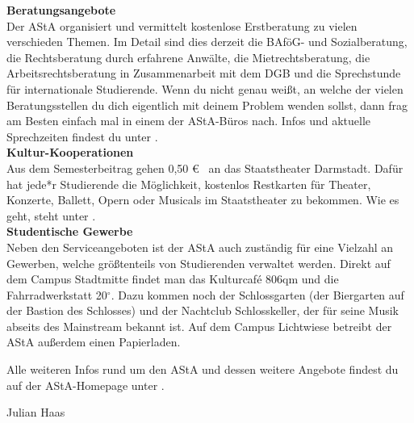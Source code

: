 {    \noindent\textbf{Beratungsangebote}\\
    Der AStA organisiert und vermittelt kostenlose Erstberatung zu vielen verschieden Themen. Im Detail sind dies derzeit die BAföG- und Sozialberatung, die Rechtsberatung durch erfahrene Anwälte, die Mietrechtsberatung, die Arbeitsrechtsberatung in Zusammenarbeit mit dem DGB und die Sprechstunde für internationale Studierende. Wenn du nicht genau weißt, an welche der vielen Beratungsstellen du dich eigentlich mit deinem Problem wenden sollst, dann frag am Besten einfach mal in einem der AStA-Büros nach. Infos und aktuelle Sprechzeiten findest du unter \footnotemark[4].\\

    \noindent\textbf{Kultur-Kooperationen}\\
    Aus dem Semesterbeitrag gehen 0,50 \euro~ an das Staatstheater Darmstadt. Dafür hat jede*r Studierende die Möglichkeit, kostenlos Restkarten für Theater, Konzerte, Ballett, Opern oder Musicals im Staatstheater zu bekommen. Wie es geht, steht unter \footnotemark[5].\\

    \noindent\textbf{Studentische Gewerbe}\\
    Neben den Serviceangeboten ist der AStA auch zuständig für eine Vielzahl an Gewerben, welche größtenteils von Studierenden verwaltet werden. Direkt auf dem Campus Stadtmitte findet man das Kulturcaf\'e 806qm und die Fahrradwerkstatt 20$^\circ$. Dazu kommen noch der Schlossgarten (der Biergarten auf der Bastion des Schlosses) und der Nachtclub Schlosskeller, der für seine Musik abseits des Mainstream bekannt ist. Auf dem Campus Lichtwiese betreibt der AStA außerdem einen Papierladen.

    Alle weiteren Infos rund um den AStA und dessen weitere Angebote findest du auf der AStA-Homepage unter \footnotemark[6].
}
{Julian Haas}


\newpage
